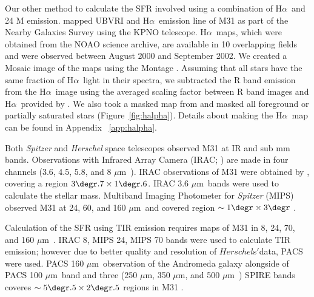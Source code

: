 \documentclass[useAMS,usenatbib]{mn2e}
\newcommand \halpha    {H$\alpha $\ }
\newcommand \um    {$\mu$m\ }
\newcommand \Spitzer {{\it Spitzer }}
\begin{document}
\label{sec:vislight}
Our other method to calculate the SFR involved using a combination of \halpha and 24 M emission. \cite{Massey06, Massey07} mapped UBVRI and \halpha emission line of M31 as part of the Nearby Galaxies Survey using the KPNO telescope. \halpha maps, which were obtained from the NOAO science archive, are available in 10 overlapping fields and were observed between August 2000 and September 2002. We created a Mosaic image of the maps using the Montage \citep{Berriman08}. Assuming that all stars have the same fraction of \halpha light in their spectra, we subtracted the R band emission from the \halpha image using the averaged scaling factor between R band images and \halpha provided by \cite{Azimlu11}. We also took a masked map from \cite{Azimlu11} and masked all foreground or partially saturated stars (Figure~\ref{fig:halpha}). Details about making the \halpha map can be found in Appendix ~\ref{app:halpha}.

Both {\em Spitzer} \citep{Werner04} and {\em Herschel} \citep{Pilbratt10}  space telescopes observed M31 at IR and sub mm bands. Observations with Infrared Array Camera (IRAC; \citep{Fazio04}) are made in four channels (3.6, 4.5, 5.8, and 8 \um). IRAC observations of M31 were obtained by \cite{Barmby06}, covering a region $3\degr.7 \times 1\degr.6$. IRAC 3.6 \um bands were used to calculate the stellar mass. Multiband Imaging Photometer for \Spitzer (MIPS) observed M31 at 24, 60, and 160 \um and covered region $\sim 1\degr \times 3\degr$ \citep{Gordon06}.

Calculation of the SFR using TIR emission requires maps of M31 in 8, 24, 70, and 160 \um. IRAC 8, MIPS 24, MIPS 70 bands were used to calculate TIR emission; however due to better quality and resolution of $Herschel$s$'$data, PACS \citep[Photodetector Array Camera and Spectrometer;][]{Poglitsch10} were used. PACS 160 \um observation of the Andromeda galaxy alongside of PACS 100 \um band and three (250 $\mu$m, 350 $\mu$m, and 500 \um) SPIRE \citep[Spectral and Photometric Imaging Receiver;][]{Griffin10} bands coveres $\sim 5\degr.5 \times 2\degr.5$ regions in M31 \citep{Fritz12}.
\end{document}
